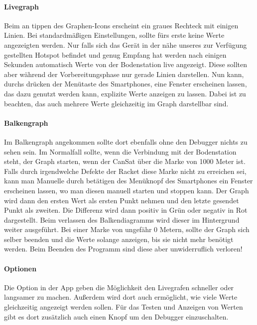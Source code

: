 	\paragraph{Livegraph}
	Beim an tippen des Graphen-Icons erscheint ein graues Rechteck mit einigen Linien. Bei standardmäßigen Einstellungen, sollte fürs erste keine Werte angezeigten werden. Nur falls sich das Gerät in der nähe unseres zur Verfügung gestellten Hotspot befindet und genug Empfang hat werden nach einigen Sekunden automatisch Werte von der Bodenstation live angezeigt. Diese sollten aber während der Vorbereitungsphase nur gerade Linien darstellen. Nun kann, durchs  drücken der Menütaste des Smartphones, eine Fenster erscheinen lassen, das dazu genutzt werden kann, explizite Werte anzeigen zu lassen. Dabei ist zu beachten, das auch mehrere Werte gleichzeitig im Graph darstellbar sind.
	\paragraph{Balkengraph}
	Im Balkengraph angekommen sollte dort ebenfalls ohne den Debugger nichts zu sehen sein. Im Normalfall sollte, wenn die Verbindung mit der Bodenstation steht, der Graph starten, wenn der CanSat über die Marke von 1000 Meter ist. Falls durch irgendwelche Defekte der Racket diese Marke nicht zu erreichen sei, kann man Manuelle durch betätigen des Menüknopf des Smartphones ein Fenster erscheinen lassen, wo man diesen manuell starten und stoppen kann. Der Graph wird dann den ersten Wert als ersten Punkt nehmen und den letzte gesendet Punkt als zweiten. Die Differenz wird dann positiv in Grün oder negativ in Rot dargestellt. Beim verlassen des Balkendiagramms wird dieser im Hintergrund weiter ausgeführt. Bei einer Marke von ungefähr 0 Metern, sollte der Graph sich selber beenden und die Werte solange anzeigen, bis sie nicht mehr benötigt werden. Beim Beenden des Programm sind diese aber unwiderruflich verloren!
	\paragraph{Optionen}
	Die Option in der App geben die Möglichkeit den Livegrafen schneller oder langsamer zu machen. Außerdem wird dort auch ermöglicht, wie viele Werte gleichzeitig angezeigt werden sollen. Für das Testen und Anzeigen von Werten gibt es dort zusätzlich auch einen Knopf um den Debugger einzuschalten.
	
